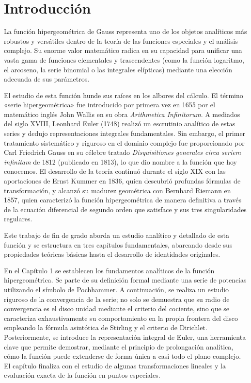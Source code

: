 \documentclass[12pt,a4paper]{book}
\begin{document}
\tableofcontents 
\newpage
\thispagestyle{empty} 

\cleardoublepage
\markboth{}{} 
\chapter*{Introducción}
\thispagestyle{plain} 
La función hipergeométrica de Gauss representa uno de los objetos analíticos más robustos y versátiles dentro de la teoría de las funciones especiales y el análisis complejo. Su enorme valor matemático radica en su capacidad para unificar una vasta gama de funciones elementales y trascendentes (como la función logaritmo, el arcoseno, la serie binomial o las integrales elípticas) mediante una elección adecuada de sus parámetros.

El estudio de esta función hunde sus raíces en los albores del cálculo. El término «serie hipergeométrica» fue introducido por primera vez en 1655 por el matemático inglés John Wallis en su obra \textit{Arithmetica Infinitorum}. A mediados del siglo XVIII, Leonhard Euler (1748) realizó un escrutinio analítico de estas series y dedujo representaciones integrales fundamentales. Sin embargo, el primer tratamiento sistemático y riguroso en el dominio complejo fue proporcionado por Carl Friedrich Gauss en su célebre tratado \textit{Disquisitiones generales circa seriem infinitam} de 1812 (publicado en 1813), lo que dio nombre a la función que hoy conocemos. El desarrollo de la teoría continuó durante el siglo XIX con las aportaciones de Ernst Kummer en 1836, quien descubrió profundas fórmulas de transformación, y alcanzó su madurez geométrica con Bernhard Riemann en 1857, quien caracterizó la función hipergeométrica de manera definitiva a través de la ecuación diferencial de segundo orden que satisface y sus tres singularidades regulares.

Este trabajo de fin de grado aborda un estudio analítico y detallado de esta función y se estructura en tres capítulos fundamentales, abarcando desde sus propiedades teóricas básicas hasta el desarrollo de identidades originales.

En el Capítulo 1 se establecen los fundamentos analíticos de la función hipergeométrica. Se parte de su definición formal mediante una serie de potencias utilizando el símbolo de Pochhammer. A continuación, se realiza un estudio riguroso de la convergencia de la serie; no solo se demuestra que su radio de convergencia es el disco unidad mediante el criterio del cociente, sino que se caracteriza exhaustivamente su comportamiento en la propia frontera del disco empleando la fórmula asintótica de Stirling y el criterio de Dirichlet. Posteriormente, se introduce la representación integral de Euler, una herramienta clave que permite demostrar, mediante el principio de prolongación analítica, cómo la función puede extenderse de forma única a casi todo el plano complejo. El capítulo finaliza con el estudio de algunas transformaciones lineales y la evaluación exacta de la función en puntos especiales.
\end{document}
